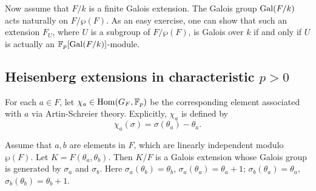 \documentclass[12pt,leqno]{amsart}
\theoremstyle{plain}
\theoremstyle{definition}
\newcommand{\F}{{\mathbb F}}
\begin{document}
Now assume that $F/k$ is a finite Galois extension. The Galois group ${\rm Gal}(F/k)$  acts naturally on $F/\wp(F)$. As an easy exercise, one can show that such an extension $F_U$, where $U$ is a subgroup of $F/\wp(F)$, is Galois over  $k$ if and only if $U$ is actually an $\F_p[{\rm Gal}(F/k)]$-module.

\subsection{Heisenberg extensions in characteristic $p>0$}  
For each $a\in F$, let $\chi_a\in {\rm Hom}(G_F,\F_p)$ be the  corresponding element associated with $a$ via Artin-Schreier theory. Explicitly, $\chi_a$ is defined by 
\[
\chi_a(\sigma)= \sigma(\theta_a)-\theta_a.
\]

Assume that $a,b$ are elements in $F$, which are linearly independent modulo $\wp(F)$. Let $K= F(\theta_a,\theta_b)$. Then $K/F$ is a Galois extension whose Galois group is generated by $\sigma_a$ and $\sigma_b$. Here $\sigma_a(\theta_b)=\theta_b$, $\sigma_a(\theta_a)= \theta_{a}+1$; $\sigma_b(\theta_{a})=\theta_{a}$, $\sigma_b(\theta_{b})= \theta_{b}+1$. 
\end{document}
